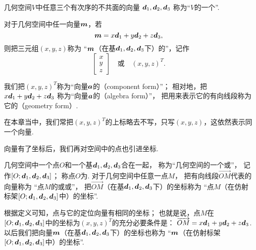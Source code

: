 \begin{definition}
几何空间\(V\)中任意三个有次序的不共面的向量
\(\boldsymbol{d}_1,\boldsymbol{d}_2,\boldsymbol{d}_3\)
称为“\(V\)的一个”.

对于几何空间中任一向量\(\boldsymbol{m}\)，若\begin{equation*}
	\boldsymbol{m} = x \boldsymbol{d}_1 + y \boldsymbol{d}_2 + z \boldsymbol{d}_3,
\end{equation*}
则把三元组\((x,y,z)\)称为
“\(\boldsymbol{m}\)（在基\(\boldsymbol{d}_1,\boldsymbol{d}_2,\boldsymbol{d}_3\)下）的”，记作\begin{equation*}
	\begin{bmatrix} x \\ y \\ z \end{bmatrix}
	\quad\text{或}\quad
	(x,y,z)^T.
\end{equation*}
\end{definition}

我们把\((x,y,z)^T\)称为“向量\(\boldsymbol{a}\)的（component form）”；
相对地，把\(x \boldsymbol{d}_1 + y \boldsymbol{d}_2 + z \boldsymbol{d}_3\)
称为“向量\(\boldsymbol{a}\)的（algebra form）”，
把用来表示它的有向线段称为它的（geometry form）.

在本章当中，我们常把\((x,y,z)^T\)的上标略去不写，只写\((x,y,z)\)，这依然表示同一个向量.

向量有了坐标后，我们再对空间中的点也引进坐标.

\begin{definition}
几何空间中一个点\(O\)和一个基\(\boldsymbol{d}_1,\boldsymbol{d}_2,\boldsymbol{d}_3\)合在一起，
称为“几何空间的一个或”，
记作\([O;\boldsymbol{d}_1,\boldsymbol{d}_2,\boldsymbol{d}_3]\)；
称点\(O\)为.
对于几何空间中任意一点\(M\)，
把有向线段\(\vec{OM}\)代表的向量称为
“点\(M\)的或或”，
把\(\vec{OM}\)（在基\(\boldsymbol{d}_1,\boldsymbol{d}_2,\boldsymbol{d}_3\)下）的坐标称为
“点\(M\)（在仿射标架\([O;\boldsymbol{d}_1,\boldsymbol{d}_2,\boldsymbol{d}_3]\)中）的坐标”.
\end{definition}

根据定义可知，点与它的定位向量有相同的坐标；
也就是说，点\(M\)在\([O;\boldsymbol{d}_1,\boldsymbol{d}_2,\boldsymbol{d}_3]\)中的坐标为\((x,y,z)^T\)的充分必要条件是：
\(\overrightarrow{OM} = x \boldsymbol{d}_1 + y \boldsymbol{d}_2 + z \boldsymbol{d}_3\).
以后我们把向量\(\boldsymbol{m}\)（在基\(\boldsymbol{d}_1,\boldsymbol{d}_2,\boldsymbol{d}_3\)下）的坐标也称为
“\(\boldsymbol{m}\)（在仿射标架\([O;\boldsymbol{d}_1,\boldsymbol{d}_2,\boldsymbol{d}_3]\)中）的坐标”.

